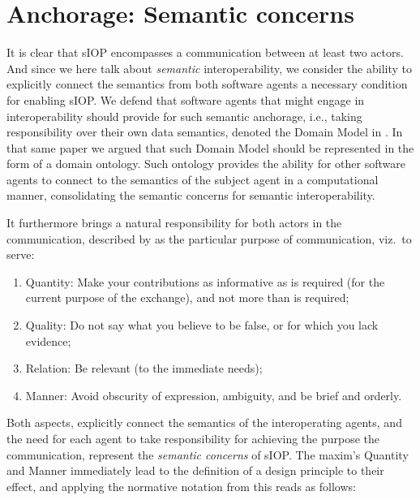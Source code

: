 \documentclass[sort&compress,preprint,authoryear,3p,twocolumn]{elsarticle}
\providecommand{\tightlist}{%
  \setlength{\itemsep}{0pt}\setlength{\parskip}{0pt}}
\begin{document}
\hypertarget{anchorage-semantic-concerns}{%
\section{Anchorage: Semantic
concerns}\label{anchorage-semantic-concerns}}

It is clear that sIOP encompasses a communication between at least two
actors. And since we here talk about \emph{semantic} interoperability,
we consider the ability to explicitly connect the semantics from both
software agents a necessary condition for enabling sIOP. We defend that
software agents that might engage in interoperability should provide for
such semantic anchorage, i.e., taking responsibility over their own data
semantics, denoted the Domain Model in \citep{Brandt2018a}. In that same
paper we argued that such Domain Model should be represented in the form
of a domain ontology. Such ontology provides the ability for other
software agents to connect to the semantics of the subject agent in a
computational manner, consolidating the semantic concerns for semantic
interoperability.

It furthermore brings a natural responsibility for both actors in the
communication, described by \citep{Grice:1991BT} as the particular
purpose of communication, viz.~to serve:

\begin{enumerate}
\def\labelenumi{\arabic{enumi}.}
\tightlist
\item
  Quantity: Make your contributions as informative as is required (for
  the current purpose of the exchange), and not more than is required;
\item
  Quality: Do not say what you believe to be false, or for which you
  lack evidence;
\item
  Relation: Be relevant (to the immediate needs);
\item
  Manner: Avoid obscurity of expression, ambiguity, and be brief and
  orderly.
\end{enumerate}

Both aspects, explicitly connect the semantics of the interoperating
agents, and the need for each agent to take responsibility for achieving
the purpose the communication, represent the \emph{semantic concerns} of
sIOP. The maxim's Quantity and Manner immediately lead to the definition
of a design principle to their effect, and applying the normative
notation from \citep{Greefhorst2011} this reads as follows:
\end{document}
